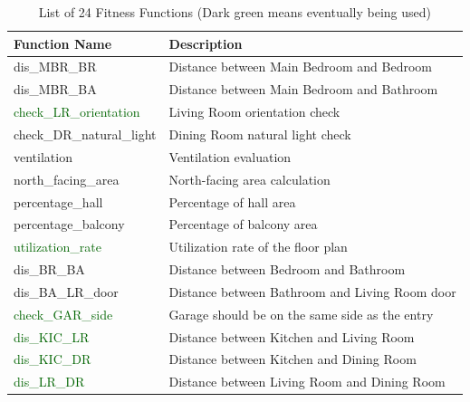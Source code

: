 \documentclass[]{article}
\begin{document}
\begin{table}[h]
    \centering
    \caption{List of 24 Fitness Functions (Dark green means eventually being used)}
    \label{tab:fitness_functions}
    \begin{tabularx}{\textwidth}{l l}
        \hline
        \textbf{Function Name}                         & \textbf{Description}                           \\
        \hline
        dis\_MBR\_BR                                   & Distance between Main Bedroom and Bedroom      \\
        dis\_MBR\_BA                                   & Distance between Main Bedroom and Bathroom     \\
        \textcolor{darkgreen}{check\_LR\_orientation}  & Living Room orientation check                  \\
        check\_DR\_natural\_light                      & Dining Room natural light check                \\
        ventilation                                    & Ventilation evaluation                         \\
        north\_facing\_area                            & North-facing area calculation                  \\
        percentage\_hall                               & Percentage of hall area                        \\
        percentage\_balcony                            & Percentage of balcony area                     \\
        \textcolor{darkgreen}{utilization\_rate }      & Utilization rate of the floor plan             \\
        dis\_BR\_BA                                    & Distance between Bedroom and Bathroom          \\
        dis\_BA\_LR\_door                              & Distance between Bathroom and Living Room door \\
        \textcolor{darkgreen}{check\_GAR\_side}        & Garage should be on the same side as the entry \\
        \textcolor{darkgreen}{dis\_KIC\_LR}            & Distance between Kitchen and Living Room       \\
        \textcolor{darkgreen}{dis\_KIC\_DR}            & Distance between Kitchen and Dining Room       \\
        \textcolor{darkgreen}{dis\_LR\_DR}             & Distance between Living Room and Dining Room   \\

\end{tabularx}
\end{table}
\end{document}
